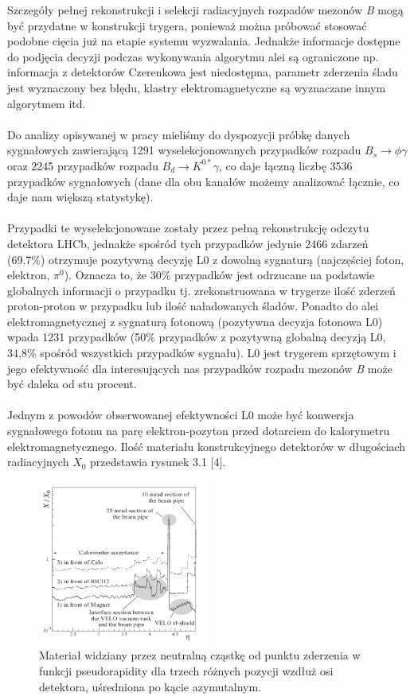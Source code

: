 \documentclass{pracamgr}
\begin{document}
\noindent
Szczegóły pełnej rekonstrukcji i selekcji radiacyjnych rozpadów mezonów \textit{B} mogą być przydatne w konstrukcji trygera, ponieważ można próbować stosować podobne cięcia już na etapie systemu wyzwalania. Jednakże informacje dostępne do podjęcia decyzji podczas wykonywania algorytmu alei są ograniczone np. informacja z detektorów Czerenkowa jest niedostępna, parametr zderzenia śladu jest wyznaczony bez błędu, klastry elektromagnetyczne są wyznaczane innym algorytmem itd.
\\\\
\noindent
Do analizy opisywanej w pracy mieliśmy do dyspozycji próbkę danych sygnałowych zawierającą 1291 wyselekcjonowanych przypadków rozpadu $B_s\rightarrow \phi\gamma$ oraz 2245 przypadków rozpadu $B_d\rightarrow K^{0*}\gamma$, co daje łączną liczbę 3536 przypadków sygnałowych (dane dla obu kanałów możemy analizować łącznie, co daje nam większą statystykę). 
\\\\
\noindent
Przypadki te wyselekcjonowane zostały przez pełną rekonstrukcję odczytu detektora LHCb, jednakże spośród tych przypadków jedynie 2466 zdarzeń (69.7\%) otrzymuje pozytywną decyzję L0 z dowolną sygnaturą (najczęściej foton, elektron, $\pi^0$). Oznacza to, że 30\% przypadków jest odrzucane na podstawie globalnych informacji o przypadku tj. zrekonstruowana w trygerze ilość zderzeń proton-proton w przypadku lub ilość naładowanych śladów. Ponadto do alei elektromagnetycznej z sygnaturą fotonową (pozytywna decyzja fotonowa L0) wpada 1231 przypadków (50\% przypadków z pozytywną globalną decyzją L0, 34,8\% spośród wszystkich przypadków sygnału). L0 jest trygerem sprzętowym i jego efektywność dla interesujących nas przypadków rozpadu mezonów \textit{B} może być daleka od stu procent.
\\\\
\noindent
Jednym z powodów obserwowanej efektywności L0 może być konwersja sygnałowego fotonu na parę elektron-pozyton przed dotarciem do kalorymetru elektromagnetycznego. Ilość materiału konstrukcyjnego detektorów w długościach radiacyjnych $X_0$ przedstawia rysunek 3.1 [4]. 

\begin{figure}[!h]
 \centering
 \includegraphics[width=0.5\textwidth]{rysunki/radiationl.png}
 \caption{Materiał widziany przez neutralną cząstkę od punktu zderzenia w funkcji pseudorapidity dla trzech różnych pozycji wzdłuż osi detektora, uśredniona po kącie azymutalnym.}
\end{figure}
\end{document}
